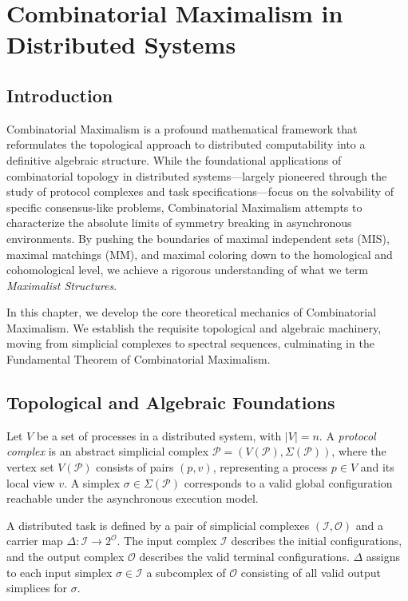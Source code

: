 \chapter{Combinatorial Maximalism in Distributed Systems}

\section{Introduction}
Combinatorial Maximalism is a profound mathematical framework that reformulates the topological approach to distributed computability into a definitive algebraic structure. While the foundational applications of combinatorial topology in distributed systems—largely pioneered through the study of protocol complexes and task specifications—focus on the solvability of specific consensus-like problems, Combinatorial Maximalism attempts to characterize the absolute limits of symmetry breaking in asynchronous environments. By pushing the boundaries of maximal independent sets (MIS), maximal matchings (MM), and maximal coloring down to the homological and cohomological level, we achieve a rigorous understanding of what we term \textit{Maximalist Structures}.

In this chapter, we develop the core theoretical mechanics of Combinatorial Maximalism. We establish the requisite topological and algebraic machinery, moving from simplicial complexes to spectral sequences, culminating in the Fundamental Theorem of Combinatorial Maximalism.

\section{Topological and Algebraic Foundations}

\begin{definition}
Let $V$ be a set of processes in a distributed system, with $|V| = n$. A \textit{protocol complex} is an abstract simplicial complex $\mathcal{P} = (V(\mathcal{P}), \Sigma(\mathcal{P}))$, where the vertex set $V(\mathcal{P})$ consists of pairs $(p, v)$, representing a process $p \in V$ and its local view $v$. A simplex $\sigma \in \Sigma(\mathcal{P})$ corresponds to a valid global configuration reachable under the asynchronous execution model.
\end{definition}

\begin{definition}
A distributed task is defined by a pair of simplicial complexes $(\mathcal{I}, \mathcal{O})$ and a carrier map $\Delta: \mathcal{I} \to 2^{\mathcal{O}}$. The input complex $\mathcal{I}$ describes the initial configurations, and the output complex $\mathcal{O}$ describes the valid terminal configurations. $\Delta$ assigns to each input simplex $\sigma \in \mathcal{I}$ a subcomplex of $\mathcal{O}$ consisting of all valid output simplices for $\sigma$.
\end{definition}

